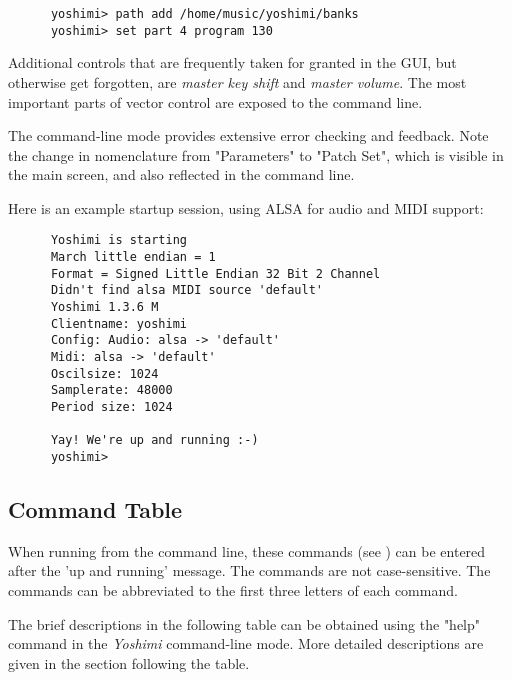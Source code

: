    \begin{verbatim}
      yoshimi> path add /home/music/yoshimi/banks
      yoshimi> set part 4 program 130
   \end{verbatim}

   Additional controls that are frequently taken for granted in the GUI, but
   otherwise get forgotten, are \textsl{master key shift} and \textsl{master
   volume}.  The most important parts of vector control are exposed to the
   command line.

   The command-line mode provides extensive error checking and feedback.
   Note the change in nomenclature from "Parameters" to "Patch Set", which is
   visible in the main screen, and also reflected in the command line.

   Here is an example startup session, using ALSA for audio and MIDI support:

   \begin{verbatim}
      Yoshimi is starting
      March little endian = 1
      Format = Signed Little Endian 32 Bit 2 Channel
      Didn't find alsa MIDI source 'default'
      Yoshimi 1.3.6 M
      Clientname: yoshimi
      Config: Audio: alsa -> 'default'
      Midi: alsa -> 'default'
      Oscilsize: 1024
      Samplerate: 48000
      Period size: 1024

      Yay! We're up and running :-)
      yoshimi> 
   \end{verbatim}

\subsection{Command Table}
\label{subsec:command_line_command_table}

   When running from the command line, these commands
   (see )
   can be entered after the 'up and running' message.
   The commands are not case-sensitive.
   The commands can be abbreviated to the first three letters of each command.

   The brief descriptions in the following table can be obtained
   using the "help" command in the \textsl{Yoshimi} command-line mode.
   More detailed descriptions are given in the section following the table.

